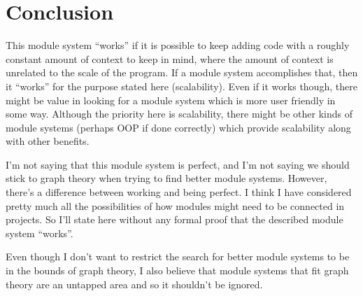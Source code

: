 \documentclass{article}
\begin{document}
\section{Conclusion}

This module system “works” if it is possible to keep adding code with a roughly constant amount of context to keep in mind, where the amount of context is unrelated to the scale of the program. If a module system accomplishes that, then it “works” for the purpose stated here (scalability). Even if it works though, there might be value in looking for a module system which is more user friendly in some way. Although the priority here is scalability, there might be other kinds of module systems (perhaps OOP if done correctly) which provide scalability along with other benefits.


I’m not saying that this module system is perfect, and I’m not saying we should stick to graph theory when trying to find better module systems. However, there’s a difference between working and being perfect. I think I have considered pretty much all the possibilities of how modules might need to be connected in projects. So I’ll state here without any formal proof that the described module system “works”.


Even though I don’t want to restrict the search for better module systems to be in the bounds of graph theory, I also believe that module systems that fit graph theory are an untapped area and so it shouldn’t be ignored.
\end{document}
